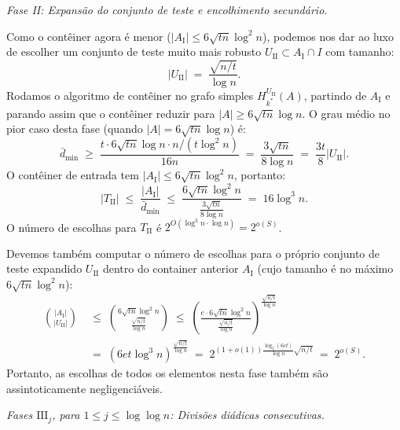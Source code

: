 \documentclass[reqno,a4paper,12pt]{amsart}
\begin{document}
\noindent\textit{Fase II: Expansão do conjunto de teste e encolhimento secundário.}

Como o contêiner agora é menor ($|A_{\mathrm{I}}| \leq 6\sqrt{t n}\log^2 n$), podemos nos dar ao luxo de escolher um conjunto de teste muito mais robusto $U_{\mathrm{II}} \subset A_{\mathrm{I}} \cap I$ com tamanho:
\[
  |U_{\mathrm{II}}| \;=\; \frac{\sqrt{n/t}}{\log n}.
\]
Rodamos o algoritmo de contêiner no grafo simples $H_{k^*}^{U_{\mathrm{II}}}(A)$, partindo de $A_{\mathrm{I}}$ e parando assim que o contêiner reduzir para $|A| \geq 6\sqrt{t n}\log n$. O grau médio no pior caso desta fase (quando $|A| = 6\sqrt{tn}\log n$) é:
\[
  \bar{d}_{\min} \;\geq\; \frac{t \cdot 6\sqrt{tn}\log n \cdot n/(t\log^2 n)}{16n} \;=\; \frac{3\sqrt{tn}}{8\log n} \;=\; \frac{3t}{8}|U_\mathrm{II}|.
\]
O contêiner de entrada tem $|A_\mathrm{I}| \leq 6\sqrt{tn}\log^2 n$, portanto:
\[
  |T_{\mathrm{II}}| \;\leq\; \frac{|A_\mathrm{I}|}{\bar{d}_{\min}} \;\leq\; \frac{6\sqrt{tn}\log^2 n}{\frac{3\sqrt{tn}}{8\log n}} \;=\; 16\log^3 n.
\]
O número de escolhas para $T_\mathrm{II}$ é $2^{O(\log^3 n \cdot \log n)} = 2^{o(S)}$.

Devemos também computar o número de escolhas para o próprio conjunto de teste expandido $U_{\mathrm{II}}$ dentro do container anterior $A_{\mathrm{I}}$ (cujo tamanho é no máximo $6\sqrt{t n}\log^2 n$):
\begin{align*}
  \binom{|A_{\mathrm{I}}|}{|U_{\mathrm{II}}|} \; & \leq\; \binom{6\sqrt{t n}\log^2 n}{\frac{\sqrt{n/t}}{\log n}} \;\leq\; \left( \frac{e \cdot 6\sqrt{t n}\log^2 n}{\frac{\sqrt{n/t}}{\log n}} \right)^{\frac{\sqrt{n/t}}{\log n}} \\
                                                 & =\; \left( 6e t \log^3 n \right)^{\frac{\sqrt{n/t}}{\log n}} \;=\; 2^{(1+o(1))\frac{\log_2(6e t)}{\log n}\sqrt{n/t}} \;=\; 2^{o(S)}.
\end{align*}
Portanto, as escolhas de todos os elementos nesta fase também são assintoticamente negligenciáveis.

\medskip

\noindent\textit{Fases $\mathrm{III}_j$, para $1 \leq j \leq \log\log n$: Divisões diádicas consecutivas.}
\end{document}
